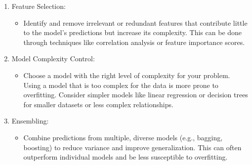 \begin{enumerate}
        \item Feature Selection:
            \begin{itemize}
                \item Identify and remove irrelevant or redundant features that contribute little to the model's predictions but increase its complexity. This can be done through techniques like correlation analysis or feature importance scores.
            \end{itemize}

        \item Model Complexity Control:
            \begin{itemize}
                \item Choose a model with the right level of complexity for your problem. Using a model that is too complex for the data is more prone to overfitting. Consider simpler models like linear regression or decision trees for smaller datasets or less complex relationships.
            \end{itemize}
        
        \item Ensembling:
            \begin{itemize}
                \item Combine predictions from multiple, diverse models (e.g., bagging, boosting) to reduce variance and improve generalization. This can often outperform individual models and be less susceptible to overfitting.
            \end{itemize}
        
        
    \end{enumerate}

